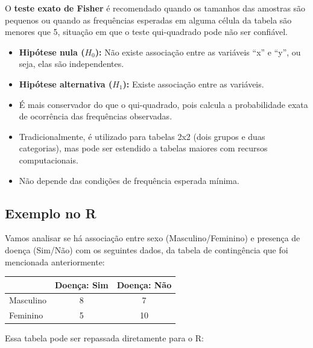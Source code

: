 \documentclass[
]{book}
\newcounter{none} %
\begin{document}
O \textbf{teste exato de Fisher} é recomendado quando os tamanhos das amostras são pequenos ou quando as frequências esperadas em alguma célula da tabela são menores que 5, situação em que o teste qui-quadrado pode não ser confiável.

\begin{itemize}
\item
  \textbf{Hipótese nula (\(H_0\)):} Não existe associação entre as variáveis ``x'' e ``y'', ou seja, elas são independentes.
\item
  \textbf{Hipótese alternativa (\(H_1\)):} Existe associação entre as variáveis.
\item
  É mais conservador do que o qui-quadrado, pois calcula a probabilidade exata de ocorrência das frequências observadas.
\item
  Tradicionalmente, é utilizado para tabelas 2x2 (dois grupos e duas categorias), mas pode ser estendido a tabelas maiores com recursos computacionais.
\item
  Não depende das condições de frequência esperada mínima.
\end{itemize}

\subsection{Exemplo no R}\label{exemplo-no-r-1}

Vamos analisar se há associação entre sexo (Masculino/Feminino) e presença de doença (Sim/Não) com os seguintes dados, da tabela de contingência que foi mencionada anteriormente:

{\def\LTcaptype{none} %
\begin{longtable}[]{@{}lcc@{}}
\toprule\noalign{}
& Doença: Sim & Doença: Não \\
\midrule\noalign{}
\endhead
\bottomrule\noalign{}
\endlastfoot
Masculino & 8 & 7 \\
Feminino & 5 & 10 \\
\end{longtable}
}

Essa tabela pode ser repassada diretamente para o R:
\end{document}
